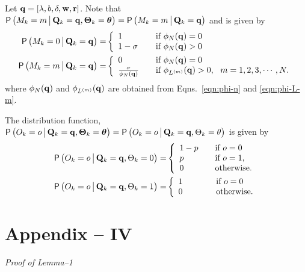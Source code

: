 \documentclass[acmtosn]{acmtrans2m}
\newcommand{\prob}[1]{\mathsf{P}\left(#1\right)}
\begin{document}
Let ${\bf q} = [\lambda, b, \delta, {\bf w},{\bf r}]$.
Note that 
$\prob{M_k = m \big\arrowvert 
{\bf Q}_k ={\bf q},
{\bf \Theta}_k = {\mbox{\boldmath$\theta$}} 
} 
= \prob{M_k = m \big\arrowvert {\bf Q}_k = {\bf q}}$ and is given by 
\begin{align*}
\prob{M_k = 0 \big\arrowvert {\bf Q}_k = {\bf q}} = & \left\{
\begin{array}{ll}
1          & \hspace{4mm}\text{if} \ \phi_N({\bf q}) = 0\\ 
1-\sigma   & \hspace{4mm}\text{if} \ \phi_N({\bf q}) > 0 
\end{array}
\right. \\
\prob{M_k = m \big\arrowvert {\bf Q}_k = {\bf q}} = & \left\{
\begin{array}{ll}
0 & \ \ \ \text{if} \ \phi_N({\bf q}) = 0\\ 
\frac{\sigma}{\phi_N({\bf q})} & \ \ \  \text{if} \ \phi_{L^{(m)}}({\bf q}) > 0, \ \ m=1,2,3,\cdots,N. 
\end{array}
\right.
\end{align*}
where $\phi_N({\bf q})$ and $\phi_{L^{(m)}}({\bf q})$ are obtained from
Eqns.~\ref{eqn:phi-n} and \ref{eqn:phi-L-m}.

The distribution function,
$\prob{ O_{k} = o \big\arrowvert {\bf Q}_k = {\bf q},
{\bf \Theta}_k = {\mbox{\boldmath$\theta$}}}  =  
\prob{ O_{k} = o \big\arrowvert {\bf Q}_k = {\bf q},
{\Theta}_k = \theta }$ 
is given by
\begin{align*}
\prob{ O_{k} = o \big\arrowvert {\bf Q}_k = {\bf q},
{\Theta}_k = 0}  
= & \left\{
\begin{array}{ll}
1-p   & \ \ \ \text{if} \ o  = 0 \\
p     & \ \ \ \text{if} \ o  = 1,\\ 
0     & \ \ \ \text{otherwise}.
\end{array}
\right. \\ 
\prob{ O_{k} = o \big\arrowvert {\bf Q}_k = {\bf q},
{\Theta}_k = 1}  
= & \left\{
\begin{array}{ll}
1 & \hspace{7mm} \ \ \ \text{if} \ o  = 0\\ 
0 & \hspace{7mm} \ \ \ \text{otherwise}.
\end{array}
\right. 
\end{align*}



\section*{Appendix -- IV}
\emph{Proof of Lemma--1}
\end{document}
